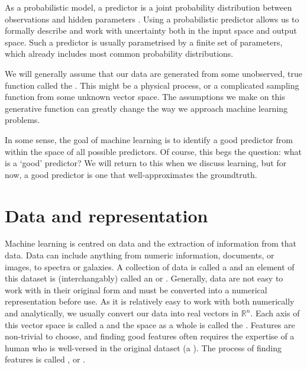     As a probabilistic model, a predictor is a joint probability distribution between observations and hidden parameters \citep{deisenroth_mathematics_2020}. Using a probabilistic predictor allows us to formally describe and work with uncertainty both in the input space and output space. Such a predictor is usually parametrised by a finite set of parameters, which already includes most common probability distributions.

    We will generally assume that our data are generated from some unobserved, true function called the . This might be a physical process, or a complicated sampling function from some unknown vector space. The assumptions we make on this generative function can greatly change the way we approach machine learning problems.

    In some sense, the goal of machine learning is to identify a good predictor from within the space of all possible predictors. Of course, this begs the question: what is a `good' predictor? We will return to this when we discuss learning, but for now, a good predictor is one that well-approximates the groundtruth.

\section{Data and representation}
\label{sec:data-and-representation}

    Machine learning is centred on data and the extraction of information from that data. Data can include anything from numeric information, documents, or images, to spectra or galaxies. A collection of data is called a  and an element of this dataset is (interchangably) called an  or . Generally, data are not easy to work with in their original form and must be converted into a numerical representation before use. As it is relatively easy to work with both numerically and analytically, we usually convert our data into real vectors in $\mathbb R^n$. Each axis of this vector space is called a  and the space as a whole is called the . Features are non-trivial to choose, and finding good features often requires the expertise of a human who is well-versed in the original dataset (a ). The process of finding features is called , or .

